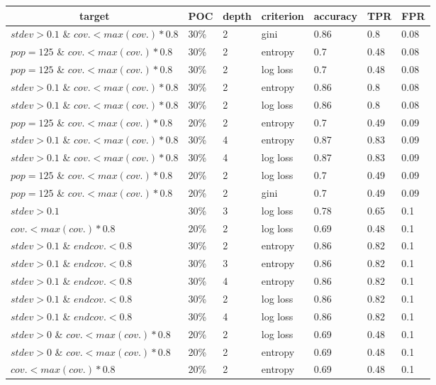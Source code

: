 \begin{tabular}{lllllll}
\hline
\multicolumn{1}{c}{target} & POC & depth & criterion & accuracy & TPR & FPR \\
\hline
$stdev > 0.1$ \& $cov. < max(cov.) * 0.8$	&	30\%	&	2	&	gini	&	0.86	&	0.8	&	0.08 \\
$pop = 125$ \& $cov. < max(cov.) * 0.8$	&	30\%	&	2	&	entropy	&	0.7	&	0.48	&	0.08 \\
$pop = 125$ \& $cov. < max(cov.) * 0.8$	&	30\%	&	2	&	log loss	&	0.7	&	0.48	&	0.08 \\
$stdev > 0.1$ \& $cov. < max(cov.) * 0.8$	&	30\%	&	2	&	entropy	&	0.86	&	0.8	&	0.08 \\
$stdev > 0.1$ \& $cov. < max(cov.) * 0.8$	&	30\%	&	2	&	log loss	&	0.86	&	0.8	&	0.08 \\
$pop = 125$ \& $cov. < max(cov.) * 0.8$	&	20\%	&	2	&	entropy	&	0.7	&	0.49	&	0.09 \\
$stdev > 0.1$ \& $cov. < max(cov.) * 0.8$	&	30\%	&	4	&	entropy	&	0.87	&	0.83	&	0.09 \\
$stdev > 0.1$ \& $cov. < max(cov.) * 0.8$	&	30\%	&	4	&	log loss	&	0.87	&	0.83	&	0.09 \\
$pop = 125$ \& $cov. < max(cov.) * 0.8$	&	20\%	&	2	&	log loss	&	0.7	&	0.49	&	0.09 \\
$pop = 125$ \& $cov. < max(cov.) * 0.8$	&	20\%	&	2	&	gini	&	0.7	&	0.49	&	0.09 \\
$stdev > 0.1$	&	30\%	&	3	&	log loss	&	0.78	&	0.65	&	0.1 \\
$cov. < max(cov.) * 0.8$	&	20\%	&	2	&	log loss	&	0.69	&	0.48	&	0.1 \\
$stdev > 0.1$ \& $end cov. < 0.8$	&	30\%	&	2	&	entropy	&	0.86	&	0.82	&	0.1 \\
$stdev > 0.1$ \& $end cov. < 0.8$	&	30\%	&	3	&	entropy	&	0.86	&	0.82	&	0.1 \\
$stdev > 0.1$ \& $end cov. < 0.8$	&	30\%	&	4	&	entropy	&	0.86	&	0.82	&	0.1 \\
$stdev > 0.1$ \& $end cov. < 0.8$	&	30\%	&	2	&	log loss	&	0.86	&	0.82	&	0.1 \\
$stdev > 0.1$ \& $end cov. < 0.8$	&	30\%	&	4	&	log loss	&	0.86	&	0.82	&	0.1 \\
$stdev > 0$ \& $cov. < max(cov.) * 0.8$	&	20\%	&	2	&	log loss	&	0.69	&	0.48	&	0.1 \\
$stdev > 0$ \& $cov. < max(cov.) * 0.8$	&	20\%	&	2	&	entropy	&	0.69	&	0.48	&	0.1 \\
$cov. < max(cov.) * 0.8$	&	20\%	&	2	&	entropy	&	0.69	&	0.48	&	0.1 \\

\end{tabular}
